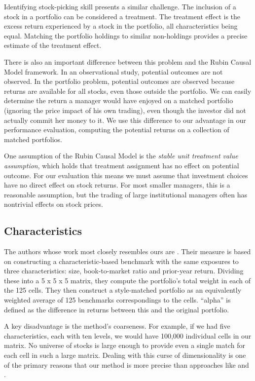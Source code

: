 \documentclass{article}\usepackage{graphicx, color}
\begin{document}
Identifying stock-picking skill presents a similar challenge. The
inclusion of a stock in a portfolio can be considered a treatment. The
treatment effect is the excess return experienced by a stock in the
portfolio, all characteristics being equal. Matching the portfolio
holdings to similar non-holdings provides a precise estimate of the
treatment effect.

There is also an important difference between this problem and the
Rubin Causal Model framework. In an observational study, potential
outcomes are not observed. In the portfolio problem, potential
outcomes are observed because returns are available for all stocks,
even those outside the portfolio. We can easily determine the return
a manager would have enjoyed on a matched portfolio (ignoring the
price impact of his own trading), even though the investor did not
actually commit her money to it. We use this difference to our
advantage in our performance
evaluation, computing the potential returns on a collection of matched
portfolios.

One assumption of the Rubin Causal Model is the
\emph{stable unit treatment value assumption}, which holds that
treatment assignment has no effect on potential outcome. For
our evaluation this means we must assume that investment choices have
no direct effect on stock returns. For most smaller managers, this is
a reasonable assumption, but the trading of large institutional
managers often has nontrivial effects on stock prices.

\subsection{Characteristics \label{SectionCharacteristics}}

The authors whose work most closely resembles ours are
\cite{daniel97.1}. Their measure is based on constructing a
characteristic-based benchmark with the same exposures to three
characteristics: size, book-to-market ratio and prior-year
return. Dividing these into a 5 x 5 x 5 matrix, they compute the
portfolio's total weight in each of the 125
cells. They then construct a style-matched portfolio as an
equivalently weighted average of 125 benchmarks correspondings to the
cells. ``alpha'' is defined as the difference in returns between this
and the original portfolio.

A key disadvantage is the method's coarseness. For example, if we had
five characteristics, each with ten levels, we would have 100,000
individual cells in our matrix. No universe of stocks is large enough
to provide even a single match for each cell in such a large
matrix. Dealing with this curse of dimensionality is one of the
primary reasons that our method is more precise than approaches like
\cite{daniel97.1} and \cite{ferson04}.
\end{document}
